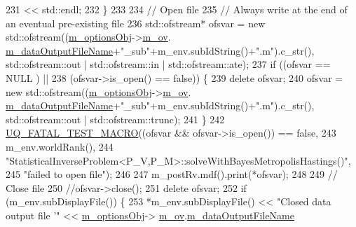 \begin{DoxyCode}
231                                 << std::endl;
232       \}
233 
234       \textcolor{comment}{// Open file}
235       \textcolor{comment}{// Always write at the end of an eventual pre-existing file}
236       std::ofstream* ofsvar = \textcolor{keyword}{new} std::ofstream((\hyperlink{class_q_u_e_s_o_1_1_statistical_inverse_problem_a481954f01d55bab4c1a36392fecb4a12}{m\_optionsObj}->\hyperlink{class_q_u_e_s_o_1_1_statistical_inverse_problem_options_a3f432ce80a98a70c33376bf9a1c4b36c}{m\_ov}.
      \hyperlink{class_q_u_e_s_o_1_1_sip_options_values_a5b68edcbfca8473657ee8d58cfc16fb6}{m\_dataOutputFileName}+\textcolor{stringliteral}{"\_sub"}+m\_env.subIdString()+\textcolor{stringliteral}{".m"}).c\_str(), std::ofstream::out | 
      std::ofstream::in | std::ofstream::ate);
237       \textcolor{keywordflow}{if} ((ofsvar            == NULL ) ||
238           (ofsvar->is\_open() == \textcolor{keyword}{false})) \{
239         \textcolor{keyword}{delete} ofsvar;
240         ofsvar = \textcolor{keyword}{new} std::ofstream((\hyperlink{class_q_u_e_s_o_1_1_statistical_inverse_problem_a481954f01d55bab4c1a36392fecb4a12}{m\_optionsObj}->\hyperlink{class_q_u_e_s_o_1_1_statistical_inverse_problem_options_a3f432ce80a98a70c33376bf9a1c4b36c}{m\_ov}.
      \hyperlink{class_q_u_e_s_o_1_1_sip_options_values_a5b68edcbfca8473657ee8d58cfc16fb6}{m\_dataOutputFileName}+\textcolor{stringliteral}{"\_sub"}+m\_env.subIdString()+\textcolor{stringliteral}{".m"}).c\_str(), std::ofstream::out | 
      std::ofstream::trunc);
241       \}
242       \hyperlink{_defines_8h_a56d63d18d0a6d45757de47fcc06f574d}{UQ\_FATAL\_TEST\_MACRO}((ofsvar && ofsvar->is\_open()) == \textcolor{keyword}{false},
243                           m\_env.worldRank(),
244                           \textcolor{stringliteral}{"StatisticalInverseProblem<P\_V,P\_M>::solveWithBayesMetropolisHastings()"},
245                           \textcolor{stringliteral}{"failed to open file"});
246 
247       m\_postRv.mdf().print(*ofsvar);
248 
249       \textcolor{comment}{// Close file}
250       \textcolor{comment}{//ofsvar->close();}
251       \textcolor{keyword}{delete} ofsvar;
252       \textcolor{keywordflow}{if} (m\_env.subDisplayFile()) \{
253         *m\_env.subDisplayFile() << \textcolor{stringliteral}{"Closed data output file '"} << \hyperlink{class_q_u_e_s_o_1_1_statistical_inverse_problem_a481954f01d55bab4c1a36392fecb4a12}{m\_optionsObj}->
      \hyperlink{class_q_u_e_s_o_1_1_statistical_inverse_problem_options_a3f432ce80a98a70c33376bf9a1c4b36c}{m\_ov}.\hyperlink{class_q_u_e_s_o_1_1_sip_options_values_a5b68edcbfca8473657ee8d58cfc16fb6}{m\_dataOutputFileName}

\end{DoxyCode}
